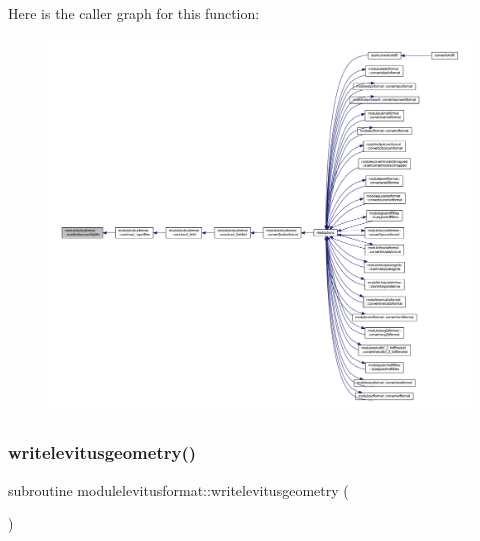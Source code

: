 Here is the caller graph for this function\+:\nopagebreak
\begin{figure}[H]
\begin{center}
\leavevmode
\includegraphics[width=350pt]{namespacemodulelevitusformat_abe175ce441457a68d1d3d191baa3732a_icgraph}
\end{center}
\end{figure}
\mbox{\label{namespacemodulelevitusformat_a6b331414c3615b8cf034262b51b17a6b}} 
\subsubsection{\texorpdfstring{writelevitusgeometry()}{writelevitusgeometry()}}
{\footnotesize\ttfamily subroutine modulelevitusformat\+::writelevitusgeometry (\begin{DoxyParamCaption}{ }\end{DoxyParamCaption})\hspace{0.3cm}{\ttfamily [private]}}

